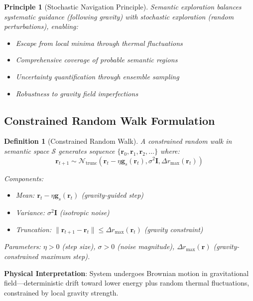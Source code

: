\documentclass[12pt,a4paper]{article}
\newtheorem{definition}{Definition}
\newtheorem{principle}{Principle}
\begin{document}
\begin{principle}[Stochastic Navigation Principle]
Semantic exploration balances systematic guidance (following gravity) with stochastic exploration (random perturbations), enabling:
\begin{itemize}
\item Escape from local minima through thermal fluctuations
\item Comprehensive coverage of probable semantic regions
\item Uncertainty quantification through ensemble sampling
\item Robustness to gravity field imperfections
\end{itemize}
\end{principle}

\subsection{Constrained Random Walk Formulation}

\begin{definition}[Constrained Random Walk]
A constrained random walk in semantic space $\mathcal{S}$ generates sequence $\{\mathbf{r}_0, \mathbf{r}_1, \mathbf{r}_2, \ldots\}$ where:
\begin{equation}
\mathbf{r}_{t+1} \sim \mathcal{N}_{\text{trunc}}(\mathbf{r}_t - \eta \mathbf{g}_s(\mathbf{r}_t), \sigma^2 \mathbf{I}, \Delta r_{\max}(\mathbf{r}_t))
\end{equation}

Components:
\begin{itemize}
\item Mean: $\mathbf{r}_t - \eta \mathbf{g}_s(\mathbf{r}_t)$ (gravity-guided step)
\item Variance: $\sigma^2 \mathbf{I}$ (isotropic noise)
\item Truncation: $\|\mathbf{r}_{t+1} - \mathbf{r}_t\| \leq \Delta r_{\max}(\mathbf{r}_t)$ (gravity constraint)
\end{itemize}

Parameters: $\eta > 0$ (step size), $\sigma > 0$ (noise magnitude), $\Delta r_{\max}(\mathbf{r})$ (gravity-constrained maximum step).
\end{definition}

\textbf{Physical Interpretation}: System undergoes Brownian motion in gravitational field—deterministic drift toward lower energy plus random thermal fluctuations, constrained by local gravity strength.
\end{document}
